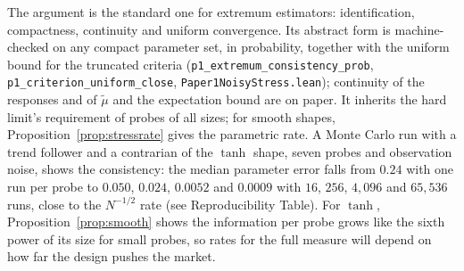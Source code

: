 The argument is the standard one for extremum estimators: identification, compactness, continuity and uniform convergence. Its abstract form is machine-checked on any compact parameter set, in probability, together with the uniform bound for the truncated criteria (\texttt{p1\_extremum\_consistency\_prob}, \texttt{p1\_criterion\_uniform\_close}, \nolinkurl{Paper1NoisyStress.lean}); continuity of the responses and of $\tilde\mu$ and the expectation bound are on paper. It inherits the hard limit's requirement of probes of all sizes; for smooth shapes, Proposition~\ref{prop:stressrate} gives the parametric rate. A Monte Carlo run with a trend follower and a contrarian of the $\tanh$ shape, seven probes and observation noise, shows the consistency: the median parameter error falls from $0.24$ with one run per probe to $0.050$, $0.024$, $0.0052$ and $0.0009$ with $16$, $256$, $4{,}096$ and $65{,}536$ runs, close to the $N^{-1/2}$ rate (see Reproducibility Table). For $\tanh$, Proposition~\ref{prop:smooth} shows the information per probe grows like the sixth power of its size for small probes, so rates for the full measure will depend on how far the design pushes the market.
